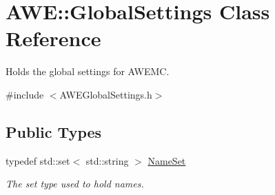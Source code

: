 \hypertarget{class_a_w_e_1_1_global_settings}{\section{A\-W\-E\-:\-:Global\-Settings Class Reference}
\label{class_a_w_e_1_1_global_settings}
}


Holds the global settings for A\-W\-E\-M\-C.  




{\ttfamily \#include $<$A\-W\-E\-Global\-Settings.\-h$>$}

\subsection*{Public Types}
\begin{DoxyCompactItemize}
\item 
\hypertarget{class_a_w_e_1_1_global_settings_a45df15954e36fb1bad5385f5249c408e}{typedef std\-::set$<$ std\-::string $>$ \hyperlink{class_a_w_e_1_1_global_settings_a45df15954e36fb1bad5385f5249c408e}{Name\-Set}}\label{class_a_w_e_1_1_global_settings_a45df15954e36fb1bad5385f5249c408e}

\begin{DoxyCompactList}\small\item\em The set type used to hold names. \end{DoxyCompactList}\end{DoxyCompactItemize}
